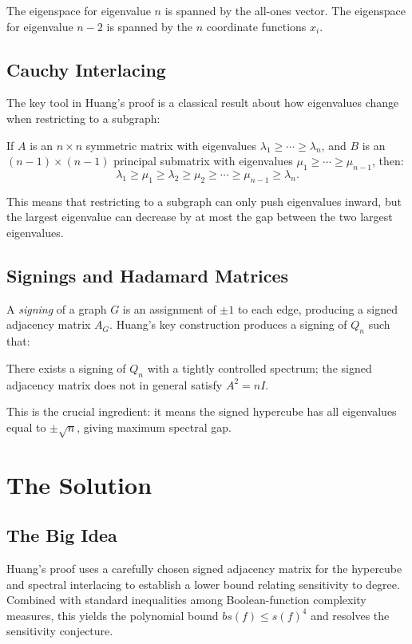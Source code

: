 The eigenspace for eigenvalue $n$ is spanned by the all-ones vector. The eigenspace for eigenvalue $n - 2$ is spanned by the $n$ coordinate functions $x_i$.

\subsection{Cauchy Interlacing}

The key tool in Huang's proof is a classical result about how eigenvalues change when restricting to a subgraph:

\begin{theorem}
If $A$ is an $n \times n$ symmetric matrix with eigenvalues $\lambda_1 \ge \cdots \ge \lambda_n$, and $B$ is an $(n-1) \times (n-1)$ principal submatrix with eigenvalues $\mu_1 \ge \cdots \ge \mu_{n-1}$, then:
\[
\lambda_1 \ge \mu_1 \ge \lambda_2 \ge \mu_2 \ge \cdots \ge \mu_{n-1} \ge \lambda_n.
\]
\end{theorem}

This means that restricting to a subgraph can only push eigenvalues inward, but the largest eigenvalue can decrease by at most the gap between the two largest eigenvalues.

\subsection{Signings and Hadamard Matrices}

A \emph{signing} of a graph $G$ is an assignment of $\pm 1$ to each edge, producing a signed adjacency matrix $A_G$. Huang's key construction produces a signing of $Q_n$ such that:

\begin{fact}
There exists a signing of $Q_n$ with a tightly controlled spectrum; the signed adjacency matrix does not in general satisfy $A^2=nI$.
\end{fact}

This is the crucial ingredient: it means the signed hypercube has all eigenvalues equal to $\pm\sqrt{n}$, giving maximum spectral gap.

\section{The Solution}

\subsection{The Big Idea}
Huang's proof uses a carefully chosen signed adjacency matrix for the hypercube and spectral interlacing to establish a lower bound relating sensitivity to degree. Combined with standard inequalities among Boolean-function complexity measures, this yields the polynomial bound $bs(f)\leq s(f)^4$ and resolves the sensitivity conjecture.

